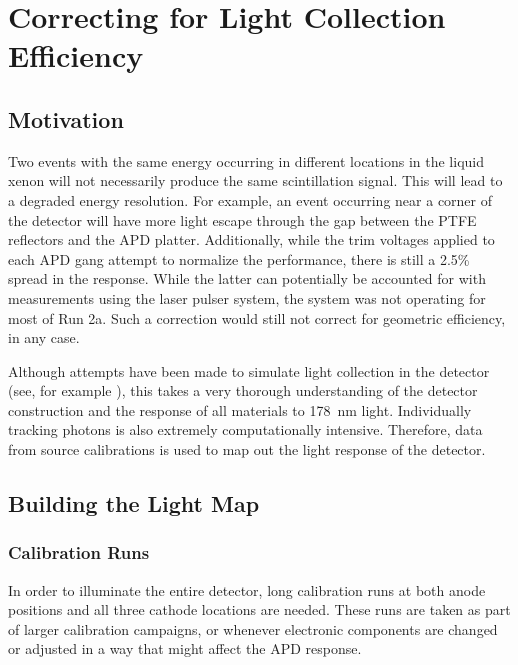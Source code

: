 \documentclass[herrin-thesis.tex]{subfiles}
\begin{document}
\chapter{Correcting for Light Collection Efficiency}
\label{app:lightmap}

\section{Motivation}
Two events with the same energy occurring in different locations in the liquid xenon will not necessarily produce the same scintillation signal. This will lead to a degraded energy resolution. For example, an event occurring near a corner of the detector will have more light escape through the gap between the PTFE reflectors and the APD platter. Additionally, while the trim voltages applied to each APD gang attempt to normalize the performance, there is still a 2.5\% spread in the response. While the latter can potentially be accounted for with measurements using the laser pulser system, the system was not operating for most of Run 2a. Such a correction would still not correct for geometric efficiency, in any case.

Although attempts have been made to simulate light collection in the detector (see, for example \cite{Mackay:2011fk}), this takes a very thorough understanding of the detector construction and the response of all materials to \SI{178}{\nm} light. Individually tracking photons is also extremely computationally intensive. Therefore, data from source calibrations is used to map out the light response of the detector.

\section{Building the Light Map}
\subsection{Calibration Runs}
In order to illuminate the entire detector, long calibration runs at both anode positions and all three cathode locations are needed. These runs are taken as part of larger calibration campaigns, or whenever electronic components are changed or adjusted in a way that might affect the APD response.
\end{document}
